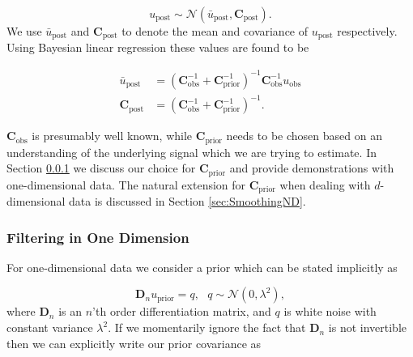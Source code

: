\documentclass[10pt,a4paper]{article}
\begin{document}
\begin{equation}
  u_\mathrm{post} \sim \mathcal{N}(\bar{u}_\mathrm{post},\mathbf{C}_\mathrm{post}).
\end{equation}
We use $\bar{u}_\mathrm{post}$ and $\mathbf{C}_\mathrm{post}$ to denote the mean and covariance of $u_\mathrm{post}$ respectively.  Using Bayesian linear regression \citep{Tarantola2005} these values are found to be  

\begin{equation}\label{eq:GeneralSolution}
\begin{split}
  \bar{u}_\mathrm{post} &= (\mathbf{C}_\mathrm{obs}^{-1} + 
                            \mathbf{C}_\mathrm{prior}^{-1})^{-1}
                            \mathbf{C}_\mathrm{obs}^{-1} u_\mathrm{obs}
\\
\mathbf{C}_\mathrm{post} &= (\mathbf{C}_\mathrm{obs}^{-1} + 
                             \mathbf{C}_\mathrm{prior}^{-1})^{-1}.                          
\end{split}
\end{equation}
 
$\mathbf{C}_\mathrm{obs}$ is presumably well known, while $\mathbf{C}_\mathrm{prior}$ needs to be chosen based on an understanding of the underlying signal which we are trying to estimate. In Section \ref{sec:Smoothing1D} we discuss our choice for $\mathbf{C}_\mathrm{prior}$ and provide demonstrations with one-dimensional data.  The natural extension for $\mathbf{C}_\mathrm{prior}$ when dealing with $d$-dimensional data is discussed in Section \ref{sec:SmoothingND}.  

\subsubsection{Filtering in One Dimension}\label{sec:Smoothing1D}
For one-dimensional data we consider a prior which can be stated implicitly as

\begin{equation}\label{eq:ImplicitPrior1D}
  \mathbf{D}_{n} u_\mathrm{prior} = q, \ \ \ q \sim \mathcal{N}(0,\lambda^2),
\end{equation}  
where $\mathbf{D}_n$ is an $n$'th order differentiation matrix, and $q$ is white noise with constant variance $\lambda^2$.  If we momentarily ignore the fact that $\mathbf{D}_n$ is not invertible then we can explicitly write our prior covariance as
\end{document}
